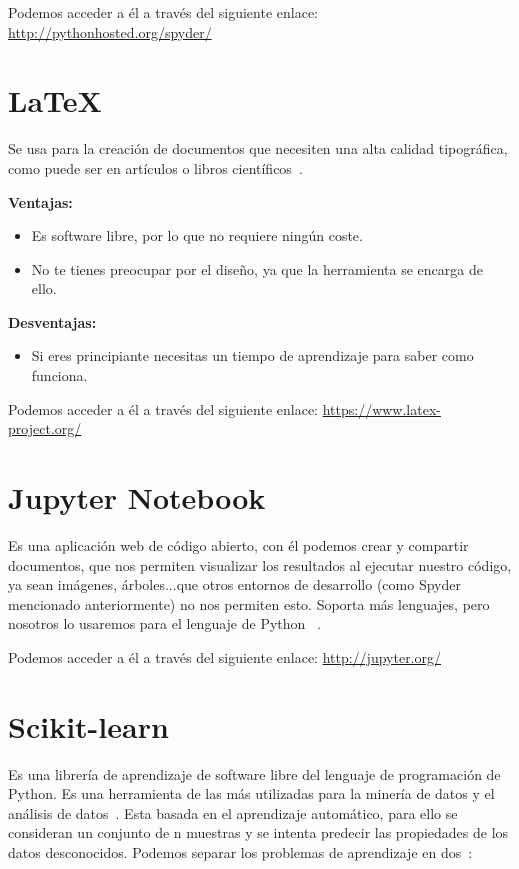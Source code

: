 Podemos acceder a él a través del siguiente enlace: 
\url{http://pythonhosted.org/spyder/}

\section{\LaTeX}
Se usa para la creación de documentos que necesiten una alta calidad tipográfica, como puede ser en artículos o libros científicos~\cite{latex}.

\textbf{Ventajas:}
\begin{itemize}
\item Es software libre, por lo que no requiere ningún coste.
\item No te tienes preocupar por el diseño, ya que la herramienta se encarga de ello.
\end{itemize}

\textbf{Desventajas:}
\begin{itemize}
\item Si eres principiante necesitas un tiempo de aprendizaje para saber como funciona.
\end{itemize}

Podemos acceder a él a través del siguiente enlace: 
\url{https://www.latex-project.org/}

\section{Jupyter Notebook}
Es una aplicación web de código abierto, con él podemos crear y compartir documentos, que nos permiten visualizar los resultados al ejecutar nuestro código, ya sean imágenes, árboles...que otros entornos de desarrollo (como Spyder mencionado anteriormente) no nos permiten esto.
Soporta más lenguajes, pero nosotros lo usaremos para el lenguaje de Python ~\cite{jupyter}.

Podemos acceder a él a través del siguiente enlace: 
\url{http://jupyter.org/}	

\section{Scikit-learn}
Es una librería de aprendizaje de software libre del lenguaje de programación de Python. Es una herramienta de las más utilizadas para la minería de datos y el análisis de datos~\cite{wiki:scikitlearn}. 
Esta basada en el aprendizaje automático, para ello se consideran un conjunto de n muestras y se intenta predecir las propiedades de los datos desconocidos. Podemos separar los problemas de aprendizaje en dos~\cite{scikitlearn}:

